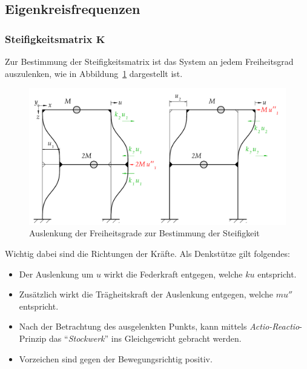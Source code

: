 \documentclass[
  letterpaper,
  DIV=11]{scrreprt}
\providecommand{\tightlist}{%
  \setlength{\itemsep}{0pt}\setlength{\parskip}{0pt}}\usepackage{longtable,booktabs,array}
\begin{document}
\hypertarget{eigenkreisfrequenzen}{%
\subsection{Eigenkreisfrequenzen}\label{eigenkreisfrequenzen}}

\hypertarget{sec-mms_steif_kmatrix}{%
\subsubsection{\texorpdfstring{Steifigkeitsmatrix
\(\mathbf{K}\)}{Steifigkeitsmatrix \textbackslash mathbf\{K\}}}\label{sec-mms_steif_kmatrix}}

Zur Bestimmung der Steifigkeitsmatrix ist das System an jedem
Freiheitsgrad auszulenken, wie in
Abbildung~\ref{fig-mms_steif_steifigkeit} dargestellt ist.

\begin{figure}[H]

{\centering \includegraphics{index_files/mediabag/bilder/aufgabe_mms_steif_auslenk.pdf}

}

\caption{\label{fig-mms_steif_steifigkeit}Auslenkung der Freiheitsgrade
zur Bestimmung der Steifigkeit}

\end{figure}

Wichtig dabei sind die Richtungen der Kräfte. Als Denkstütze gilt
folgendes:

\begin{itemize}
\tightlist
\item
  Der Auslenkung um \(u\) wirkt die Federkraft entgegen, welche \(k u\)
  entspricht.
\item
  Zusätzlich wirkt die Trägheitskraft der Auslenkung entgegen, welche
  \(m u''\) entspricht.
\item
  Nach der Betrachtung des ausgelenkten Punkts, kann mittels
  \emph{Actio-Reactio}-Prinzip das ``\emph{Stockwerk}'' ins
  Gleichgewicht gebracht werden.
\item
  Vorzeichen sind gegen der Bewegungsrichtig positiv.
\end{itemize}
\end{document}
